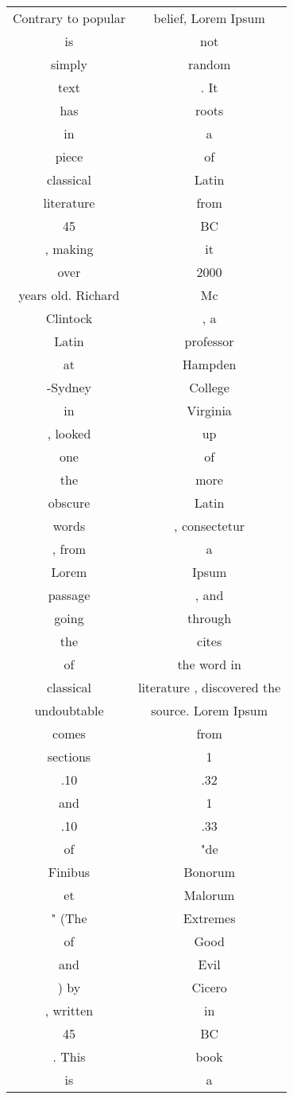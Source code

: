 \begin{appendices}
\begin{longtable}{cc}
Contrary to popular & belief, Lorem Ipsum \\ is & not \\ simply &
random \\ text &. It \\ has & roots \\ in & a \\ piece & of \\ classical & Latin
\\ literature & from \\ 45 & BC \\, making & it \\ over & 2000 \\ years old. Richard & Mc \\Clintock &, a \\ Latin & professor \\ at & Hampden \\-Sydney
& College \\ in & Virginia \\, looked & up \\ one & of \\ the & more
\\obscure & Latin \\ words &, consectetur \\, from & a \\ Lorem & Ipsum \\
passage &, and \\ going & through \\ the & cites \\ of & the word in \\
classical & literature , discovered the \\ undoubtable & source. Lorem Ipsum
\\ comes & from \\ sections & 1 \\.10 &.32 \\ and & 1 \\.10 &.33 \\ of
&"de \\ Finibus & Bonorum \\ et & Malorum \\" (The & Extremes \\ of & Good \\
and & Evil \\) by & Cicero \\, written & in \\ 45 & BC \\. This & book \\ is & a

\end{longtable}
\end{appendices}
